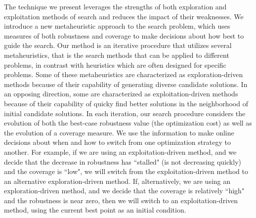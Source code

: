 The technique we present leverages the strengths of both exploration and exploitation methods of search and reduces the impact of their weaknesses.
We introduce a new metaheuristic approach to the search problem, which uses measures of both robustness and coverage to make decisions about how best to guide the search.
Our method is an iterative procedure that utilizes several metaheuristics, that is the search methods that can be applied to different problems, in contrast with heuristics which are often designed for specific problems. Some of these metaheuristics are characterized as exploration-driven methods because of their capability of generating diverse candidate solutions. In an opposing direction, some are characterized as exploitation-driven methods because of their capability of quicky find better solutions in the neighborhood of initial candidate solutions. 
In each iteration, our search procedure considers the evolution of both the best-case robustness value (the optimization cost) as well as the evolution of a coverage measure.
We use the information to make online decisions about when and how to switch from one optimization strategy to another. 
For example, if we are using an exploitation-driven method, and we decide that the decrease in robustness has ``stalled" (is not decreasing quickly) and the coverage is ``low", we will switch from the exploitation-driven method to an alternative exploration-driven method.
If, alternatively, we are using an exploration-driven method, and we decide that the coverage is relatively ``high" and the robustness is near zero, then we will switch to an exploitation-driven method, using the current best point as an initial condition.
 



